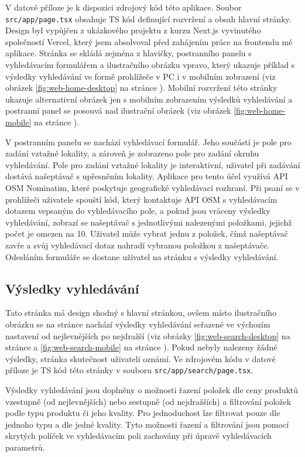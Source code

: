 V datové příloze je k dispozici zdrojový kód této aplikace. Soubor
\texttt{src/app/page.tsx} obsahuje TS kód definující rozvržení a obsah
hlavní stránky. Design byl vypůjčen z ukázkového projektu z kurzu Next.js
vyvinutého společností Vercel, který jsem absolvoval před zahájením práce
na frontendu mé aplikace. Stránka se skládá zejména z hlavičky,
postranního panelu s vyhledávacím formulářem a ilustračního obrázku vpravo,
který ukazuje příklad s výsledky vyhledávání ve formě prohlížeče v PC
i v mobilním zobrazení (viz obrázek \ref{fig:web-home-desktop} na stránce
\pageref{fig:web-home-desktop}). Mobilní rozvržení této stránky ukazuje
alternativní obrázek jen s mobilním zobrazením výsledků vyhledávání a postranní
panel se posouvá nad ilustrační obrázek (viz obrázek \ref{fig:web-home-mobile}
na stránce \pageref{fig:web-home-mobile}).

V postranním panelu se nachází vyhledávací formulář. Jeho součástí je pole
pro zadání vztažné lokality, a zároveň je zobrazeno pole pro zadání okruhu
vyhledávání. Pole pro zadání vztažné lokality je interaktivní, uživatel při
zadávání dostává našeptávač s upřesněním lokality. Aplikace pro tento účel
využívá API OSM Nominatim, které poskytuje geografické vyhledávací rozhraní.
Při psaní se v prohlížeči uživatele spouští kód, který kontaktuje API OSM
s vyhledávacím dotazem vepsaným do vyhledávacího pole, a pokud jsou vráceny
výsledky vyhledávání, zobrazí se našeptávač s jednotlivými nalezenými položkami,
jejichž počet je omezen na 10. Uživatel může vybrat jednu z položek, čímž
našeptávač zavře a svůj vyhledávací dotaz nahradí vybranou položkou
z našeptávače. Odesláním formuláře se dostane uživatel na stránku s výsledky
vyhledávání.

\subsection{Výsledky vyhledávání}

Tato stránka má design shodný s hlavní stránkou, ovšem místo ilustračního
obrázku se na stránce nachází výsledky vyhledávání seřazené ve výchozím
nastavení od nejlevnějších po nejdražší (viz obrázky
\ref{fig:web-search-desktop} na stránce \pageref{fig:web-search-desktop}
a \ref{fig:web-search-mobile} na stránce \pageref{fig:web-search-mobile}).
Pokud nebyly nalezeny žádné výsledky, stránka skutečnost uživateli
oznámí. Ve zdrojovém kódu v datové příloze je TS kód této stránky v souboru
\texttt{src/app/search/page.tsx}.

Výsledky vyhledávání jsou doplněny o možnosti řazení položek dle ceny produktů
vzestupně (od nejlevnějších) nebo sestupně (od nejdražších) a filtrování položek
podle typu produktu či jeho kvality. Pro jednoduchost lze filtrovat pouze
dle jednoho typu a dle jedné kvality. Tyto možnosti řazení a filtrování jsou
pomocí skrytých políček ve vyhledávacím poli zachovány při úpravě vyhledávacích
parametrů.

